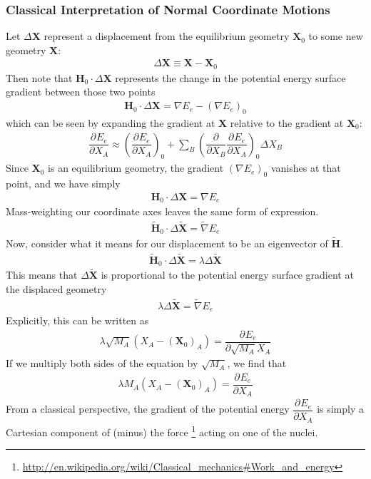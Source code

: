 \documentclass[11pt]{article}
\newcommand{\bo}[1]{\ensuremath{\mathbf{#1}}}
\newcommand{\pr}[1]{\left(#1\right)}
\newcommand{\pd}[3]{\ensuremath{ \dfrac{ \partial^{#1} #2 }{\partial #3 ^{#1}}}}
\newcommand{\D}{\ensuremath{\Delta}}
\newcommand{\la}{\ensuremath{\lambda}}
\newcommand{\tl}[1]{\ensuremath{\tilde{#1}}}
\begin{document}
\subsubsection{Classical Interpretation of Normal Coordinate Motions}
Let $\D\bo{X}$ represent a displacement from the equilibrium geometry $\bo{X}_0$ to some new geometry $\bo{X}$:
\begin{align}
	\D\bo{X}
\equiv
	\bo{X}-\bo{X}_0
\end{align}
Then note that $\bo{H}_0\cdot\D\bo{X}$ represents the change in the potential energy surface gradient between those two points
\begin{align*}
%
	\bo{H}_0\cdot\D\bo{X}
=
%
	\nabla E_e
-
	(\nabla E_e)_0
\end{align*}
which can be seen by expanding the gradient at $\bo{X}$ relative to the gradient at $\bo{X}_0$:
\begin{align}
%
	\pd{}{E_e}{X_A}
\approx
%
	\pr{\pd{}{E_e}{X_A}}_0
+\sum_B
	\pr{\pd{}{}{X_B}\pd{}{E_e}{X_A}}_0
	\D X_B
\end{align}
Since $\bo{X}_0$ is an equilibrium geometry, the gradient $(\nabla E_e)_0$ vanishes at that point, and we have simply
\begin{align*}
%
	\bo{H}_0\cdot\D\bo{X}
=
%
	\nabla E_e
\end{align*}
Mass-weighting our coordinate axes leaves the same form of expression.
\begin{align*}
%
	\tl{\bo{H}}_0\cdot\D\tl{\bo{X}}
=
%
	\tl\nabla E_e
\end{align*}
Now, consider what it means for our displacement to be an eigenvector of $\tl{\bo{H}}$.
\begin{align}
%
	\tl{\bo{H}}_0\cdot\D\tl{\bo{X}}
=
%
	\la \D\tl{\bo{X}}
\end{align}
This means that $\D\tl{\bo{X}}$ is proportional to the potential energy surface gradient at the displaced geometry
\begin{align*}
%
	\la
	\D\tl{\bo{X}}
=
%
	\tl{\nabla}E_e
\end{align*}
Explicitly, this can be written as
\begin{align*}
%
	\la
	\sqrt{M_A}
	(X_A-(\bo{X}_0)_A)
=
%
	\pd{}{E_e}{\sqrt{M_A}X_A}
\end{align*}
If we multiply both sides of the equation by $\sqrt{M_A}$, we find that
\begin{align}
%
	\la
	M_A
	(X_A-(\bo{X}_0)_A)
=
%
	\pd{}{E_e}{X_A}
\end{align}
From a classical perspective, the gradient of the potential energy {\small $\pd{}{E_e}{X_A}$} is simply a Cartesian component of (minus) the force \footnote{\url{http://en.wikipedia.org/wiki/Classical_mechanics\#Work_and_energy}} acting on one of the nuclei.
\end{document}
